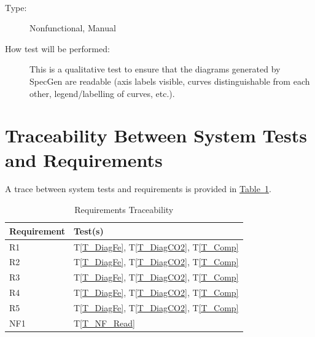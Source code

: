 \documentclass[12pt, titlepage]{article}
\newcommand{\progname}{SpecGen}
\newcounter{testnum} %
\newcommand{\testref}[1]{T\ref{#1}}
\begin{document}
		
\\
\begin{addmargin}[2em]{0em}
\begin{description}
\item[Type:] Nonfunctional, Manual
					
\item[How test will be performed:] This is a qualitative test to ensure that the 
diagrams generated by \progname{} are readable (axis labels visible, curves 
distinguishable from each other,  legend/labelling of curves, etc.).\\
\end{description}
\end{addmargin}



\section{Traceability Between System Tests and Requirements}
A trace between system tests and requirements is provided in 
\hyperref[tab:reqtrace]{Table~\ref*{tab:reqtrace}}.

\begin{table}[h]
\caption{Requirements Traceability} \label{tab:reqtrace}
\centering
\begin{tabularx}{0.55\textwidth}{p{4cm}X}
\toprule {\bf Requirement} & {\bf Test(s)}\\
\midrule
R1	&	\testref{T_DiagFe}, \testref{T_DiagCO2}, \testref{T_Comp}\\
R2	&	\testref{T_DiagFe}, \testref{T_DiagCO2}, \testref{T_Comp}\\
R3	&	\testref{T_DiagFe}, \testref{T_DiagCO2}, \testref{T_Comp}\\
R4	&	\testref{T_DiagFe}, \testref{T_DiagCO2}, \testref{T_Comp}\\
R5	&	\testref{T_DiagFe}, \testref{T_DiagCO2}, \testref{T_Comp}\\
NF1 & \testref{T_NF_Read}\\
\bottomrule
\end{tabularx}
\end{table}
\end{document}
